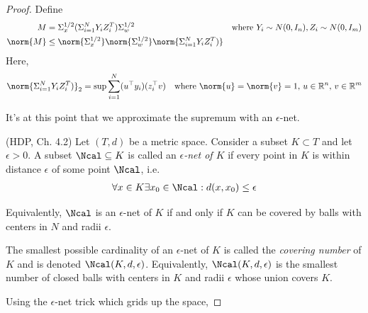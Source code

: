 \documentclass{article}[12pt]
\def \R{\mathbb R}
\begin{document}
\begin{proof}
	Define 
	\begin{align*}
	M &= \Sigma_x^{1/2} (\Sigma_{i=1}^N Y_i Z_i^T) \Sigma_w^{1/2} & \text{where $Y_i \sim N(0, I_n), Z_i \sim N(0, I_m)$}\\
	\norm{M} & \leq \norm{\Sigma_x^{1/2}}\norm{\Sigma_w^{1/2}} \norm{\Sigma_{i=1}^N Y_i Z_i^T) }
	\end{align*}
	Here,
	\begin{align*}
	\norm{\Sigma_{i=1}^N Y_i Z_i^T) }_2 &= \sup \sum_{i=1}^{N} (u^\top y_i)(z_i^\top v) & \text{where $\norm{u}=\norm{v} =1$, $u\in \R^n$, $v \in \R^m$}
	\end{align*}
	
	It's at this point that we approximate the supremum with an $\epsilon$-net. 
	
	\begin{definition}
		(HDP, Ch. 4.2)
		Let $(T,d)$ be a metric space. Consider a subset $K \subset T$ and let $\epsilon>0$.
		A subset $\Ncal \subseteq K$ is called an \emph{$\epsilon$-net of $K$} if every point in $K$ is within distance $\epsilon$ of some point $\Ncal$, i.e.
		\begin{align*}
		\forall x \in K \exists x_0 \in \Ncal : d(x, x_0)\leq \epsilon
		\end{align*}
 	\end{definition}
 Equivalently, $\Ncal$ is an $\epsilon$-net of $K$ if and only if $K$ can be covered by balls with centers in $N$ and radii $\epsilon$. 
 
 \begin{definition}
 	The smallest possible cardinality of an $\epsilon$-net of $K$ is called the \emph{covering number} of $K$ and is denoted $\Ncal (K, d, \epsilon)$. Equivalently, $\Ncal (K, d, \epsilon)$ is the smallest number of closed balls with centers in $K$ and radii $\epsilon$ whose union covers $K$.
 \end{definition}
	
	
	Using the $\epsilon$-net trick which grids up the space, 
	

\end{proof}
\end{document}
